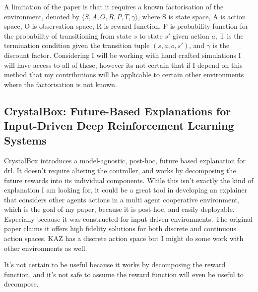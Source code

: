 \documentclass[UKenglish]{uiomasterthesis}
\begin{document}
A limitation of the paper is that it requires a known factorisation of the environment, denoted by $\langle S, A, O, R, P, T, \gamma \rangle$, where S is state space, A is action space, O is observation space, R is reward function, P is probability function for the probability of transitioning from state $s$ to state $s'$ given action $a$, T is the termination condition given the transition tuple $(s,a,o,s')$, and $\gamma$ is the discount factor. Considering I will be working with hand crafted simulations I will have access to all of these, however its not certain that if I depend on this method that my contributions will be applicable to certain other environments where the factorisation is not known.


\subsection{CrystalBox: Future-Based Explanations for Input-Driven Deep Reinforcement Learning Systems}
CrystalBox introduces a model-agnostic, post-hoc, future based explanation for \ac{drl}. It doesn't require altering the controller, and works by decomposing the future rewards into its individual components. While this isn't exactly the kind of explanation I am looking for, it could be a great tool in developing an explainer that considers other agents actions in a multi agent cooperative environment, which is the goal of my paper, because it is post-hoc, and easily deployable. Especially because it was constructed for input-driven environments. The original paper claims it offers high fidelity solutions for both discrete and continuous action spaces. KAZ has a discrete action space but I might do some work with other environments as well.

It's not certain to be useful because it works by decomposing the reward function, and it's not safe to assume the reward function will even be useful to decompose.
\end{document}
